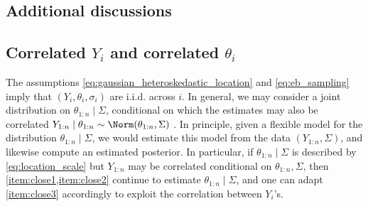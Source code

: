 \documentclass[12pt, reqno]{amsart}
\numberwithin{equation}{section}
\begin{document}
\begin{refsection}
\begin{appendices}
\section{Additional discussions}







































\subsection{Correlated $Y_i$ and correlated $\theta_i$}
\label{rmk:independence}

The assumptions \eqref{eq:gaussian_heteroskedastic_location} and \eqref{eq:eb_sampling}
imply that $(Y_i, \theta_i, \sigma_i)$ are i.i.d. across $i$. In general, we may consider
a joint distribution on $\theta_{1:n} \mid \Sigma$, conditional on which the estimates may
also be correlated $Y_ {1:n} \mid \theta_ {1:n} \sim \Norm(\theta_{1:n}, \Sigma)$ \citep
[see, among others,] [for settings in which the non-independence appears natural] 
{bonhommedenis,muller2022spatial}.
In
principle, given a flexible model for the distribution $\theta_{1:n} \mid \Sigma$, we
would estimate this model from the data $(Y_{1:n}, \Sigma)$, and likewise compute
an estimated posterior. In particular, if $\theta_{1:n} \mid \Sigma$ is described by
\eqref{eq:location_scale} but $Y_ {1:n}$ may be correlated conditional on $\theta_{1:n},
\Sigma$, then \cref{item:close1,item:close2} continue to estimate $\theta_{1:n} \mid
\Sigma$, and one can adapt \cref{item:close3} accordingly to exploit the correlation
 between $Y_i$'s.


\end{appendices}
\end{refsection}
\end{document}
